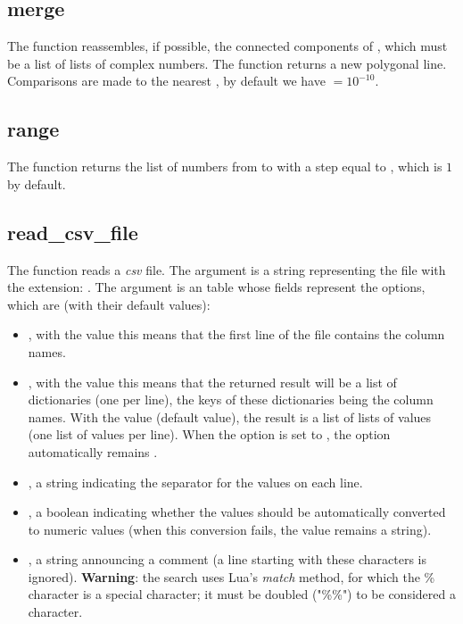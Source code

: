 \subsection{merge}

The function  reassembles, if possible, the connected components of , which must be a list of lists of complex numbers. The function returns a new polygonal line. Comparisons are made to the nearest , by default we have $=10^{-10}$.


\subsection{range}

The function  returns the list of numbers from  to  with a step equal to , which is $1$ by default.


\subsection{read\_csv\_file}

The function  reads a \emph{csv} file. The argument  is a string representing the file with the extension: . The argument  is an table whose fields represent the options, which are (with their default values):
\begin{itemize}
    \item {}, with the value \true this means that the first line of the file contains the column names.

    \item {}, with the value \true this means that the returned result will be a list of dictionaries (one per line), the keys of these dictionaries being the column names. With the value \false (default value), the result is a list of lists of values ​​(one list of values ​​per line). When the  option is set to \false, the  option automatically remains \false.

    \item {}, a string indicating the separator for the values ​​on each line.
    
    \item {}, a boolean indicating whether the values ​​should be automatically converted to numeric values ​​(when this conversion fails, the value remains a string).
    
    \item {}, a string announcing a comment (a line starting with these characters is ignored). \textbf{Warning}: the search uses Lua's \emph{match} method, for which the \% character is a special character; it must be doubled ("\%\%") to be considered a character.
\end{itemize}

